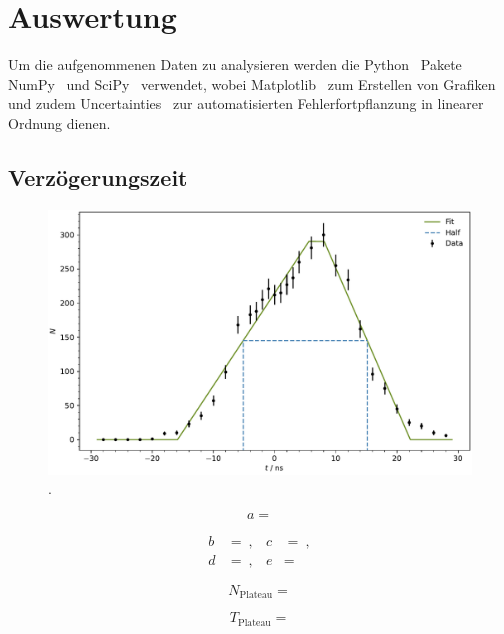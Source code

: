 \newpage
\section{Auswertung}

Um die aufgenommenen Daten zu analysieren werden die Python~\cite{python} Pakete NumPy~\cite{numpy} und SciPy~\cite{scipy} verwendet,
wobei Matplotlib~\cite{matplotlib} zum Erstellen von Grafiken und zudem Uncertainties~\cite{uncertainties} zur automatisierten
Fehlerfortpflanzung in linearer Ordnung dienen.



\subsection{Verzögerungszeit}

\begin{figure}[H]
	\centering
	\includegraphics[width=\textwidth]{build/delay.pdf}
	\caption{.}
	\label{fig:delay}
\end{figure}

\begin{equation*}
	a = 
\end{equation*}

\begin{align*}
	b &=  \: , & c &=  \: , \\
	d &=  \: , & e &= 
\end{align*}

\begin{equation*}
	N_\text{Plateau} = 
\end{equation*}

\begin{equation*}
	T_\text{Plateau} = 
\end{equation*}

